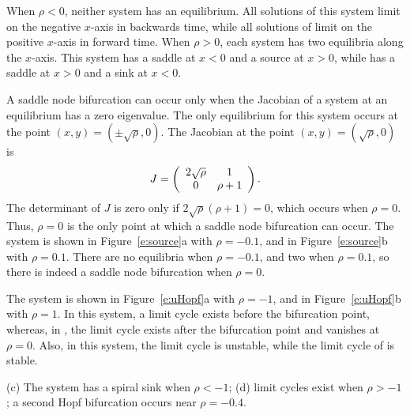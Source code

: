 \documentclass{ximera}
\begin{document}
\ans When $\rho < 0$, neither system has an equilibrium.  All solutions of
this system limit on the negative $x$-axis in backwards time, while all
solutions of  limit on the positive $x$-axis in forward time.
When $\rho > 0$, each system has two equilibria along the $x$-axis.  This
system has a saddle at $x < 0$ and a source at $x > 0$, while 
has a saddle at $x > 0$ and a sink at $x < 0$.

\soln
A saddle node bifurcation can occur only when the Jacobian of a system
at an equilibrium has a zero eigenvalue.  The only equilibrium for this
system occurs at the point $(x,y) = (\pm\sqrt{\rho},0)$.  The Jacobian
at the point $(x,y) = (\sqrt{\rho},0)$ is
\[
J = \left(\begin{array}{cc} 2\sqrt{\rho} & 1\\ 0 &\rho + 1\end{array}\right).
\]
The determinant of $J$ is zero only if $2\sqrt{\rho}(\rho + 1) = 0$, which
occurs when $\rho = 0$.  Thus, $\rho = 0$ is the only point at which a
saddle node bifurcation can occur.  The system is shown in
Figure~\ref{e:source}a with $\rho = -0.1$, and in Figure~\ref{e:source}b
with $\rho = 0.1$.  There are no equilibria when $\rho = -0.1$, and two
when $\rho = 0.1$, so there is indeed a saddle node bifurcation when
$\rho = 0$.

\begin{figure}[htb]
                       \centerline{%
                       }
\end{figure}

The system is shown in Figure~\ref{e:uHopf}a with $\rho = -1$, and in
Figure~\ref{e:uHopf}b with $\rho = 1$.  In this system, a limit cycle
exists before the bifurcation point, whereas, in , the
limit cycle exists after the bifurcation point and vanishes at
$\rho = 0$.  Also, in this system, the limit cycle is unstable, while
the limit cycle of  is stable.

\begin{figure}[htb]
                       \centerline{%
                       }
\end{figure}

\ans (c) The system has a spiral sink when $\rho<-1$; (d) limit cycles exist 
when $\rho>-1$; a second Hopf bifurcation occurs near $\rho=-0.4$.
\end{document}
